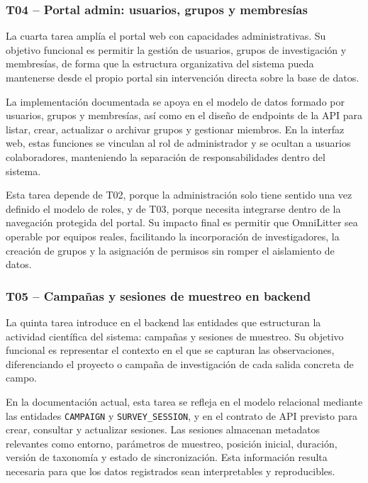 \subsubsection{T04 -- Portal admin: usuarios, grupos y membresías}

La cuarta tarea amplía el portal web con capacidades administrativas. Su objetivo
funcional es permitir la gestión de usuarios, grupos de investigación y membresías,
de forma que la estructura organizativa del sistema pueda mantenerse desde el
propio portal sin intervención directa sobre la base de datos.

La implementación documentada se apoya en el modelo de datos formado por usuarios,
grupos y membresías, así como en el diseño de endpoints de la API para listar,
crear, actualizar o archivar grupos y gestionar miembros. En la interfaz web, estas
funciones se vinculan al rol de administrador y se ocultan a usuarios colaboradores,
manteniendo la separación de responsabilidades dentro del sistema.

Esta tarea depende de T02, porque la administración solo tiene sentido una vez
definido el modelo de roles, y de T03, porque necesita integrarse dentro de la
navegación protegida del portal. Su impacto final es permitir que OmniLitter sea
operable por equipos reales, facilitando la incorporación de investigadores, la
creación de grupos y la asignación de permisos sin romper el aislamiento de datos.

\subsubsection{T05 -- Campañas y sesiones de muestreo en backend}

La quinta tarea introduce en el backend las entidades que estructuran la actividad
científica del sistema: campañas y sesiones de muestreo. Su objetivo funcional es
representar el contexto en el que se capturan las observaciones, diferenciando el
proyecto o campaña de investigación de cada salida concreta de campo.

En la documentación actual, esta tarea se refleja en el modelo relacional mediante
las entidades \texttt{CAMPAIGN} y \texttt{SURVEY\_SESSION}, y en el contrato de API
previsto para crear, consultar y actualizar sesiones. Las sesiones almacenan
metadatos relevantes como entorno, parámetros de muestreo, posición inicial,
duración, versión de taxonomía y estado de sincronización. Esta información resulta
necesaria para que los datos registrados sean interpretables y reproducibles.

